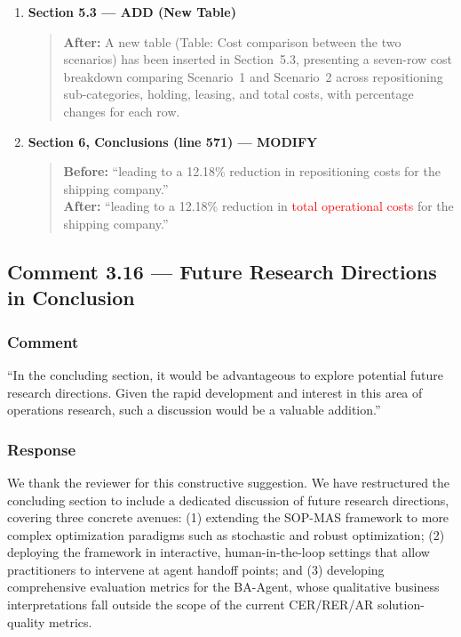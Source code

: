 \documentclass[11pt,a4paper]{article}
\begin{document}
\begin{enumerate}
\item \textbf{Section 5.3 --- ADD (New Table)}
\begin{quote}
\textbf{After:} A new table (Table: Cost comparison between the two scenarios) has been inserted in Section~5.3, presenting a seven-row cost breakdown comparing Scenario~1 and Scenario~2 across repositioning sub-categories, holding, leasing, and total costs, with percentage changes for each row.
\end{quote}

\item \textbf{Section 6, Conclusions (line 571) --- MODIFY}
\begin{quote}
\textbf{Before:} ``leading to a 12.18\% reduction in repositioning costs for the shipping company.''\\[4pt]
\textbf{After:} ``leading to a 12.18\% reduction in \textcolor{red}{total operational costs} for the shipping company.''
\end{quote}
\end{enumerate}


\subsection{Comment 3.16 --- Future Research Directions in Conclusion}

\subsubsection{Comment}
``In the concluding section, it would be advantageous to explore potential future research directions. Given the rapid development and interest in this area of operations research, such a discussion would be a valuable addition.''

\subsubsection{Response}
We thank the reviewer for this constructive suggestion. We have restructured the concluding section to include a dedicated discussion of future research directions, covering three concrete avenues: (1) extending the SOP-MAS framework to more complex optimization paradigms such as stochastic and robust optimization; (2) deploying the framework in interactive, human-in-the-loop settings that allow practitioners to intervene at agent handoff points; and (3) developing comprehensive evaluation metrics for the BA-Agent, whose qualitative business interpretations fall outside the scope of the current CER/RER/AR solution-quality metrics.
\end{document}
